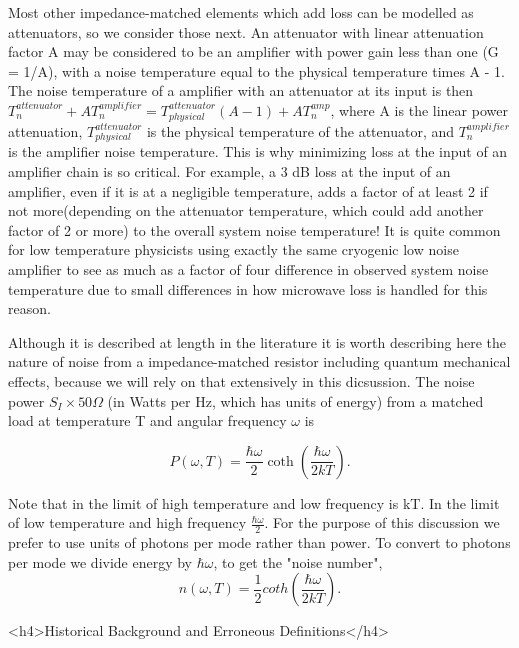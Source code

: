 \documentclass[11pt]{article}
\begin{document}
    	Most other impedance-matched elements which add loss can be modelled as attenuators, so we consider those next.  An attenuator with linear attenuation factor A may be considered to be an amplifier with power gain less than one (G = 1/A), with a noise temperature equal to the physical temperature times A - 1.  The noise temperature of a amplifier with an attenuator at its input is then $T^{attenuator}_n + AT^{amplifier}_{n} = T^{attenuator}_{physical}(A-1) + AT_n^{amp}$, where A is the linear power attenuation, $T^{attenuator}_{physical}$ is the physical temperature of the attenuator, and $T_n^{amplifier}$ is the amplifier noise temperature.  This is why minimizing loss at the input of an amplifier chain is so critical.  For example, a 3 dB loss at the input of an amplifier, even if it is at a negligible temperature, adds a factor of at least 2 if not more(depending on the attenuator temperature, which could add another factor of 2 or more) to the overall system noise temperature!  It is quite common for low temperature physicists using exactly the same cryogenic low noise amplifier to see as much as a factor of four difference in observed system noise temperature due to small differences in how microwave loss is handled for this reason.  




    	Although it is described at length in the literature it is worth describing here the nature of noise from a impedance-matched resistor including quantum mechanical effects, because we will rely on that extensively in this dicsussion.  The noise power $S_I\times 50 \Omega$ (in Watts per Hz, which has units of energy) from a matched load at temperature T and angular frequency $\omega$ is
	
$$P(\omega,T)=\frac{\hbar\omega}{2}\coth{\left(\frac{\hbar\omega}{2kT}\right)}.$$


Note that in the limit of high temperature and low frequency is kT.  In the limit of low temperature and high frequency $\frac{\hbar\omega}{2}$.  For the purpose of this discussion we prefer to use units of photons per mode rather than power.  To convert to photons per mode we divide energy by $\hbar\omega$, to get the "noise number", 
$$n(\omega,T)=\frac{1}{2}coth{\left(\frac{\hbar\omega}{2kT}\right)}.$$


<h4>Historical Background and Erroneous Definitions</h4>
\end{document}
